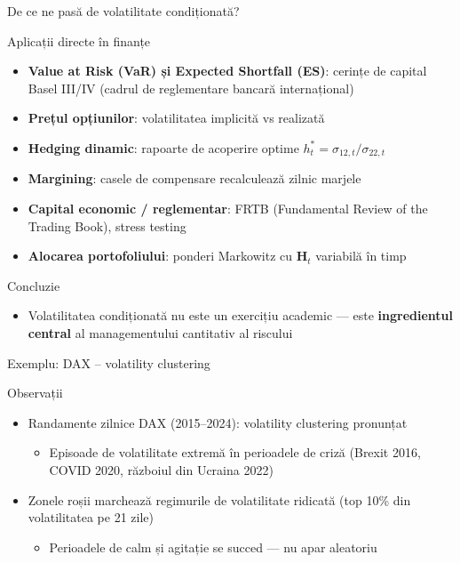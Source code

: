 \documentclass[9pt, aspectratio=169, t]{beamer}
\begin{document}
\begin{frame}{De ce ne pasă de volatilitate condiționată?}
    \small
        \begin{block}{Aplicații directe în finanțe}
            \begin{itemize}
                \item \textbf{Value at Risk (VaR) și Expected Shortfall (ES)}: cerințe de capital Basel III/IV (cadrul de reglementare bancară internațional)
                \item \textbf{Prețul opțiunilor}: volatilitatea implicită vs realizată
                \item \textbf{Hedging dinamic}: rapoarte de acoperire optime $h_t^{*} = \sigma_{12,t}/\sigma_{22,t}$
                \item \textbf{Margining}: casele de compensare recalculează zilnic marjele
                \item \textbf{Capital economic / reglementar}: FRTB (Fundamental Review of the Trading Book), stress testing
                \item \textbf{Alocarea portofoliului}: ponderi Markowitz cu $\mathbf{H}_t$ variabilă în timp
            \end{itemize}
        \end{block}
        \vspace{0.2cm}
        \begin{alertblock}{Concluzie}
            \begin{itemize}
                \item Volatilitatea condiționată nu este un exercițiu academic --- este \textbf{ingredientul central} al managementului cantitativ al riscului
            \end{itemize}
        \end{alertblock}
\end{frame}

\begin{frame}{Exemplu: DAX -- volatility clustering}
    \small
        \begin{block}{Observații}
            \begin{itemize}
                \item Randamente zilnice DAX (2015--2024): volatility clustering pronunțat
                    \begin{itemize}
                        \item Episoade de volatilitate extremă în perioadele de criză (Brexit 2016, COVID 2020, războiul din Ucraina 2022)
                    \end{itemize}
                \item Zonele roșii marchează regimurile de volatilitate ridicată (top 10\% din volatilitatea pe 21 zile)
                    \begin{itemize}
                        \item Perioadele de calm și agitație se succed --- nu apar aleatoriu
                    \end{itemize}
            \end{itemize}
        \end{block}
\end{frame}
\end{document}
